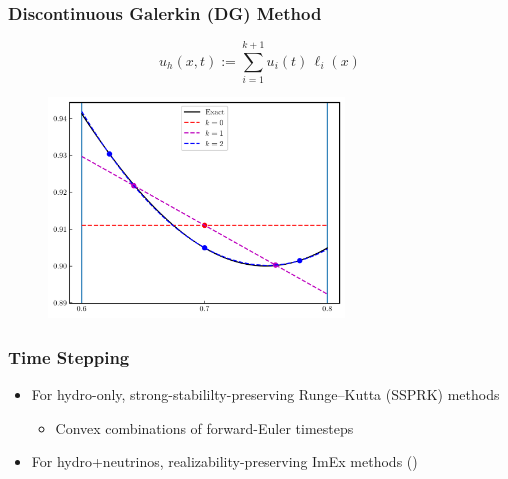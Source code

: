 \documentclass{beamer}
\begin{document}
\begin{frame}
\frametitle{Discontinuous Galerkin (DG) Method}

  \Fontvi

  \begin{equation*}
    u_{h}\left(x,t\right)
    :=\sum\limits_{i=1}^{k+1}
      u_{i}\left(t\right)\,\ell_{i}\left(x\right)
  \end{equation*}

  \begin{figure}[htb!]
    \centering
    \includegraphics[width=0.7\textwidth]{fig.DG_1D.png}
  \end{figure}

\end{frame}

\begin{frame}
\frametitle{Time Stepping}

  \begin{itemize}
    \item
      For hydro-only, strong-stabililty-preserving Runge--Kutta (SSPRK)
      methods
      \begin{itemize}
        \item
          Convex combinations of forward-Euler timesteps
      \end{itemize}
    \item
      For hydro+neutrinos, realizability-preserving ImEx methods
      (\citet{ceh2019})
  \end{itemize}

\end{frame}
\end{document}
